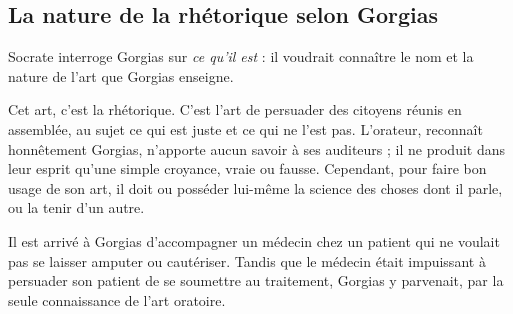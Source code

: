 
\subsection*{La nature de la rhétorique selon Gorgias}


Socrate interroge Gorgias sur \emph{ce qu'il est} : il voudrait connaître le nom et la nature de l'art que Gorgias enseigne.

Cet art, c'est la rhétorique. C'est l'art de persuader des citoyens réunis en assemblée, au sujet ce qui est juste et ce qui ne l'est pas. L'orateur, reconnaît honnêtement Gorgias, n'apporte aucun savoir à ses auditeurs ; il ne produit dans leur esprit qu'une simple croyance, vraie ou fausse. Cependant, pour faire bon usage de son art, il doit ou posséder lui-même la science des choses dont il parle, ou la tenir d'un autre.

Il est arrivé à Gorgias d'accompagner un médecin chez un patient qui ne voulait pas se laisser amputer ou cautériser. Tandis que le médecin était impuissant à persuader son patient de se soumettre au traitement, Gorgias y parvenait, par la seule connaissance de l'art oratoire.

